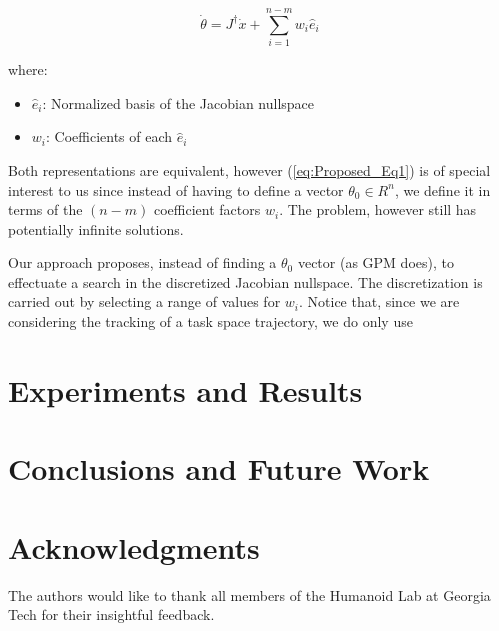 \documentclass[conference]{IEEEtran}
\newcommand{\Jps}{ \ensuremath{J^{\dagger}} }
\newcommand{\dx}{ \ensuremath{\dot{x}} }
\newcommand{\dq}{ \ensuremath{\dot{\theta}} }
\newcommand{\q}{ \ensuremath{\theta } }
\newcommand{\nsb}{ \ensuremath{ \hat{e} } }
\newcommand{\nsc}{ \ensuremath{ w } }
\begin{document}
\begin{equation}
\dq = \Jps \dx + \displaystyle \sum_{i=1}^{n-m} \nsc_{i}\nsb_{i}
\label{eq:Proposed_Eq1}
\end{equation}

where:
\begin{itemize}
\item{ $\nsb_{i}$: Normalized basis of the Jacobian nullspace}
\item{$\nsc_{i}$: Coefficients of each $\nsb_{i}$}
\end{itemize}

Both representations are equivalent, however (\ref{eq:Proposed_Eq1}) is of special interest to us since
instead of having to define a vector $\q_{0} \in R^{n}$, we define it in terms of the $(n-m)$
coefficient factors $\nsc_{i}$. The problem, however still has potentially infinite solutions.

Our approach proposes, instead of finding a $\q_{0}$ vector (as GPM does), to effectuate a 
search in the discretized Jacobian nullspace. The discretization is carried out by selecting a range of
values for $\nsc_{i}$. Notice that, since we are considering the tracking of a task space trajectory, 
we do only use    

\section{Experiments and Results}
\label{sec:Experiments}


\section{Conclusions and Future Work}
\label{sec:Conclusions}


\section*{Acknowledgments}
The authors would like to thank all members of the Humanoid Lab
at Georgia Tech for their insightful feedback.



\end{document}
